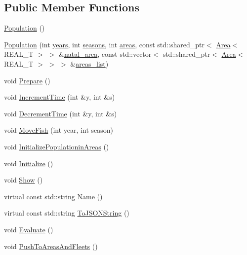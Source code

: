 \subsection*{Public Member Functions}
\begin{DoxyCompactItemize}
\item 
\hyperlink{classmas_1_1_population_a34502c0d5d6e7a40be3cc1990ba77f30}{Population} ()
\item 
\hyperlink{classmas_1_1_population_ab816687c71192f6c9e4399021ffb9527}{Population} (int \hyperlink{classmas_1_1_population_a3c5b11c403479bdc518727551791ed21}{years}, int \hyperlink{classmas_1_1_population_a3ff65a37b33f558530ed8fa065d79eb6}{seasons}, int \hyperlink{classmas_1_1_population_a5dbc73c77f78382e1d7dadfa1b24dfb8}{areas}, const std\-::shared\-\_\-ptr$<$ \hyperlink{structmas_1_1_area}{Area}$<$ R\-E\-A\-L\-\_\-\-T $>$ $>$ \&\hyperlink{classmas_1_1_population_a5ce5f6317dd632ccbf1961d0b0eca4d6}{natal\-\_\-area}, const std\-::vector$<$ std\-::shared\-\_\-ptr$<$ \hyperlink{structmas_1_1_area}{Area}$<$ R\-E\-A\-L\-\_\-\-T $>$ $>$ $>$ \&\hyperlink{classmas_1_1_population_a3633009c9043c6531989337ab8749ab3}{areas\-\_\-list})
\item 
void \hyperlink{classmas_1_1_population_a1d36dfded5ba625dd54dad0281fe201e}{Prepare} ()
\item 
void \hyperlink{classmas_1_1_population_aa109008ecb4e00a72e5c3eda31108c35}{Increment\-Time} (int \&y, int \&s)
\item 
void \hyperlink{classmas_1_1_population_a8b5d6f0d26543e164d1f86d46dccfdf2}{Decrement\-Time} (int \&y, int \&s)
\item 
void \hyperlink{classmas_1_1_population_ae0908df961a197feee21286c5b7d322a}{Move\-Fish} (int year, int season)
\item 
void \hyperlink{classmas_1_1_population_a5e6afe8e961d769cd95dfbee49c904d4}{Initialize\-Populationin\-Areas} ()
\item 
void \hyperlink{classmas_1_1_population_af4a03fed8e5d6654a91a582b5898b39f}{Initialize} ()
\item 
void \hyperlink{classmas_1_1_population_a8ff4779365c94ab8fb92f71f26d0e516}{Show} ()
\item 
virtual const std\-::string \hyperlink{classmas_1_1_population_a772b5663ac871067411c7227ed66094a}{Name} ()
\item 
virtual const std\-::string \hyperlink{classmas_1_1_population_adb6e6afabb8a27f64592f36909d43612}{To\-J\-S\-O\-N\-String} ()
\item 
void \hyperlink{classmas_1_1_population_a86400790b65e5bd774782e8919312a5f}{Evaluate} ()
\item 
void \hyperlink{classmas_1_1_population_a37a20f21ea890ff806d96122bebdbec4}{Push\-To\-Areas\-And\-Fleets} ()
\end{DoxyCompactItemize}
